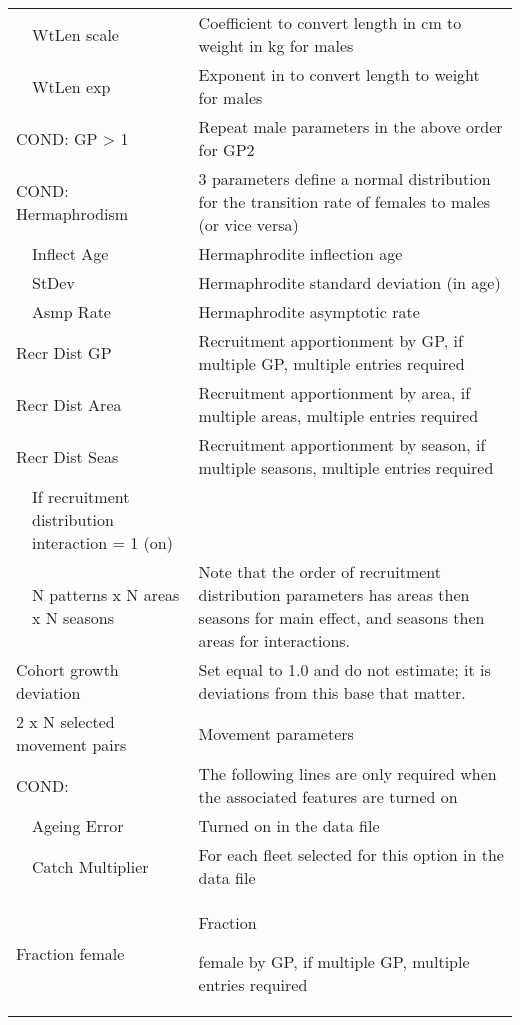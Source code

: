 \begin{center}
\begin{longtable}{p{1cm} p{2.5cm} p{10cm}}
		\hline
		& WtLen scale & Coefficient to convert length in cm to weight in kg for males\\
	    & WtLen exp & Exponent in to convert length to weight for males\\
		\hline
		\multicolumn{2}{l}{COND: GP > 1} & Repeat male parameters in the above order for GP2\\
		\hline
		\multicolumn{2}{l}{COND: Hermaphrodism} & 3 parameters define a normal distribution for the transition rate of females to males (or vice versa)\\
		& Inflect Age & Hermaphrodite inflection age\\
		& StDev & Hermaphrodite standard deviation (in age) \\
		& Asmp Rate & Hermaphrodite asymptotic rate\\
		\hline
		\multicolumn{2}{l}{Recr Dist GP} & Recruitment apportionment by GP, if multiple GP, multiple entries required\\
		\multicolumn{2}{l}{Recr Dist Area} & Recruitment apportionment by area, if multiple areas, multiple entries required\\
		\multicolumn{2}{l}{Recr Dist Seas} & Recruitment apportionment by season, if multiple seasons, multiple entries required\\
		\hline
		\pagebreak
		\multicolumn{2}{l}{COND:} & If recruitment distribution interaction = 1 (on)\\
		& N patterns x N areas x N seasons & Note that the order of recruitment distribution parameters has areas then seasons for main effect, and seasons then areas for interactions.\\
		\hline
		\multicolumn{2}{l}{Cohort growth deviation} & Set equal to 1.0 and do not estimate; it is deviations from this base that matter.\\
		\hline
		\multicolumn{2}{l}{2 x N selected movement pairs} & Movement parameters\\
		\hline
		\multicolumn{2}{l}{COND:} & The following lines are only required when the associated features are turned on\\
		& Ageing Error & Turned on in the data file\\
		& Catch Multiplier & For each fleet selected for this option in the data file\\
		\hline
		\multicolumn{2}{l}{Fraction female} & \hypertarget{SexRatio}{Fraction} female by GP, if multiple GP, multiple entries required\\
		\hline
	\end{longtable}
\end{center}

